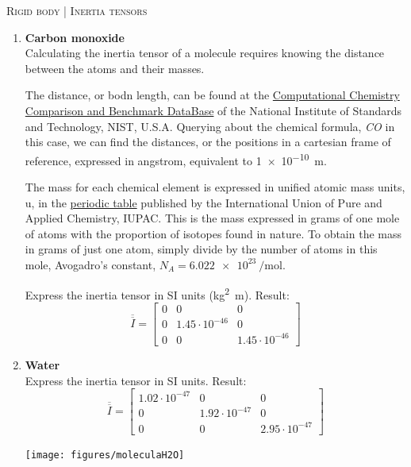 \documentclass[11pt, a4paper, twoside]{article}
\begin{document}
\begin{center}
  \textsc{\large Rigid body | Inertia tensors}
\end{center}

\begin{enumerate}
	\item
	\textbf{Carbon monoxide}\\
	Calculating the inertia tensor of a molecule requires knowing the distance between the atoms and their masses.

	The distance, or bodn length, can be found at the \href{https://cccbdb.nist.gov/exp1x.asp}{Computational Chemistry Comparison and Benchmark DataBase} of the National Institute of Standards and Technology, NIST, U.S.A.
	Querying about the chemical formula, \emph{CO} in this case, we can find the distances, or the positions in a cartesian frame of reference, expressed in \si{angstrom}, equivalent to \SI{1e-10}{\metre}.

	The mass for each chemical element is expressed in unified atomic mass units, \si{\atomicmassunit}, in the \href{https://iupac.org/what-we-do/periodic-table-of-elements/}{periodic table} published by the International Union of Pure and Applied Chemistry, IUPAC. This is the mass expressed in grams of one mole of atoms with the proportion of isotopes found in nature. To obtain the mass in grams of just one atom, simply divide by the number of atoms in this mole, Avogadro's constant, \(N_A = \SI{6.022e23}{\per\mole}\).

	Express the inertia tensor in SI units (\si{\kilogram \squared \metre}).
	Result:\\
	\[
		\overline{\overline{I}} = \left[\begin{matrix}0 & 0 & 0\\0 & 1.45 \cdot 10^{-46} & 0\\0 & 0 & 1.45 \cdot 10^{-46}\end{matrix}\right]
	\]



	\item 
	\begin{minipage}[t][3cm]{0.73\textwidth}
	\textbf{Water}\\
		Express the inertia tensor in SI units.
		Result:\\
		\[
			\overline{\overline{I}} = \left[\begin{matrix}1.02 \cdot 10^{-47} & 0 & 0\\0 & 1.92 \cdot 10^{-47} & 0\\0 & 0 & 2.95 \cdot 10^{-47}\end{matrix}\right]
		\]
	\end{minipage}
	\begin{minipage}[c][0.5cm][t]{0.2\textwidth}
		\texttt{[image: figures/moleculaH2O]}
	\end{minipage}


\end{enumerate}
\end{document}
